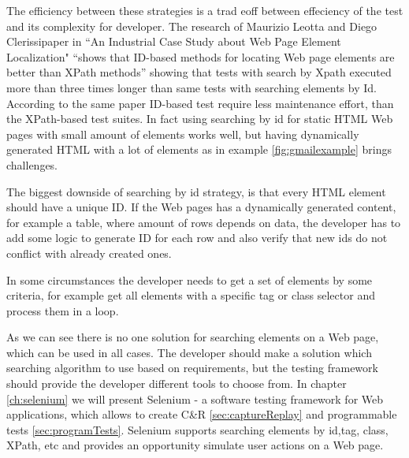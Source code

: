 		The efficiency between these strategies is a trad eoff between effeciency of
		the test and its complexity for developer. The research of Maurizio Leotta
		and Diego Clerissipaper in ``An Industrial Case Study about Web Page Element
		Localization" ``shows that ID-based methods for locating Web page elements are
		better than XPath methods''\cite{selenium4} showing that tests with search by
		Xpath executed more than three times longer than same tests with searching
		elements by Id. According to the same paper ID-based test require less
		maintenance effort, than the XPath-based test suites. In fact using searching by id for static HTML Web pages with small
		amount of elements works well, but having dynamically generated HTML with 
		a lot of elements as in example \ref{fig:gmailexample} brings challenges.
		
		The biggest downside of searching by id strategy, is that every HTML element
		should have a unique ID. If the Web pages has a dynamically generated content,
		for example a table, where amount of rows depends on data, the
		developer has to add some logic to generate ID for each row and also verify
		that new ids do not conflict with already created ones. 
		
		In some circumstances the developer needs to get a set of elements by some
		criteria, for example get all elements with a specific tag or class selector
		and process them in a loop. 
		
		As we can see there is no one solution for searching elements on a Web page,
		which can be used in all cases. The developer should make a solution which
		searching algorithm to use based on requirements, but the testing framework
		should provide the developer different tools to choose from. In chapter
		\ref{ch:selenium} we will present Selenium - a software testing framework
		for Web applications, which allows to create C\&R \ref{sec:captureReplay} and 
    programmable tests \ref{sec:programTests}. Selenium  supports searching
    elements by id,tag, class, XPath, etc and provides an opportunity simulate
    user actions on a Web page.
		

 